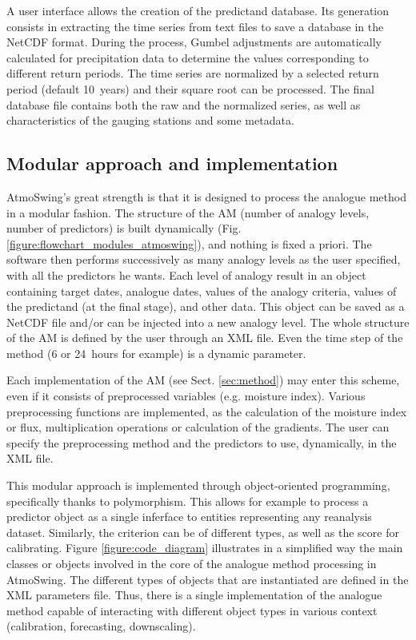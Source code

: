 \documentclass[review]{elsarticle}
\begin{document}
A user interface allows the creation of the predictand database. Its generation consists in extracting the time series from text files to save a database in the NetCDF format. During the process, Gumbel adjustments are automatically calculated for precipitation data to determine the values corresponding to different return periods. The time series are normalized by a selected return period (default 10~years) and their square root can be processed. The final database file contains both the raw and the normalized series, as well as characteristics of the gauging stations and some metadata.


\subsection{Modular approach and implementation}

AtmoSwing's great strength is that it is designed to process the analogue method in a modular fashion. The structure of the AM (number of analogy levels, number of predictors) is built dynamically (Fig. \ref{figure:flowchart_modules_atmoswing}), and nothing is fixed a priori. The software then performs successively as many analogy levels as the user specified, with all the predictors he wants. Each level of analogy result in an object containing target dates, analogue dates, values of the analogy criteria, values of the predictand (at the final stage), and other data. This object can be saved as a NetCDF file and/or can be injected into a new analogy level. The whole structure of the AM is defined by the user through an XML file. Even the time step of the method (6 or 24~hours for example) is a dynamic parameter.

Each implementation of the AM (see Sect. \ref{sec:method}) may enter this scheme, even if it consists of preprocessed variables (e.g. moisture index). Various preprocessing functions are implemented, as the calculation of the moisture index or flux, multiplication operations or calculation of the gradients. The user can specify the preprocessing method and the predictors to use, dynamically, in the XML file.

This modular approach is implemented through object-oriented programming, specifically thanks to polymorphism. This allows for example to process a predictor object as a single inferface to entities representing any reanalysis dataset. Similarly, the criterion can be of different types, as well as the score for calibrating. Figure \ref{figure:code_diagram} illustrates in a simplified way the main classes or objects involved in the core of the analogue method processing in AtmoSwing. The different types of objects that are instantiated are defined in the XML parameters file. Thus, there is a single implementation of the analogue method capable of interacting with different object types in various context (calibration, forecasting, downscaling).
\end{document}
